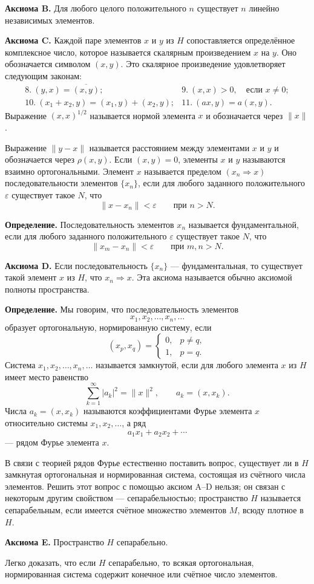 \begin{rusblock}
\textbf{Аксиома B.} Для любого целого положительного $n$ существует $n$ линейно независимых элементов.

\textbf{Аксиома C.} Каждой паре элементов $x$ и $y$ из $H$ сопоставляется определённое комплексное число, которое называется скалярным произведением $x$ на $y$. Оно обозначается символом $(x,y)$. Это скалярное произведение удовлетворяет следующим законам:
\[
\begin{array}{ll}
8.\ (y,x)=\overline{(x,y)}; & 9.\ (x,x)>0,\quad \text{если }x\ne0;\\
10.\ (x_1+x_2,y)=(x_1,y)+(x_2,y); & 11.\ (ax,y)=a(x,y).
\end{array}
\]
Выражение $(x,x)^{1/2}$ называется нормой элемента $x$ и обозначается через $\|x\|$.

Выражение $\|y-x\|$ называется расстоянием между элементами $x$ и $y$ и обозначается через $\rho(x,y)$. Если $(x,y)=0$, элементы $x$ и $y$ называются взаимно ортогональными. Элемент $x$ называется пределом $(x_n\Rightarrow x)$ последовательности элементов $\{x_n\}$, если для любого заданного положительного $\varepsilon$ существует такое $N$, что
\[
\|x-x_n\|<\varepsilon\qquad\text{при }n>N.
\]

\textbf{Определение.} Последовательность элементов $x_n$ называется фундаментальной, если для любого заданного положительного $\varepsilon$ существует такое $N$, что
\[
\|x_m-x_n\|<\varepsilon\qquad\text{при }m,n>N.
\]

\textbf{Аксиома D.} Если последовательность $\{x_n\}$ --- фундаментальная, то существует такой элемент $x$ из $H$, что $x_n\Rightarrow x$. Эта аксиома называется обычно аксиомой полноты пространства.

\textbf{Определение.} Мы говорим, что последовательность элементов
\[
x_1,x_2,\ldots,x_n,\ldots
\]
образует ортогональную, нормированную систему, если
\[
(x_p,x_q)=
\begin{cases}
0,&p\ne q,\\
1,&p=q.
\end{cases}
\]
Система $x_1,x_2,\ldots,x_n,\ldots$ называется замкнутой, если для любого элемента $x$ из $H$ имеет место равенство
\[
\sum_{k=1}^{\infty}|a_k|^2=\|x\|^2,\qquad a_k=(x,x_k).
\]
Числа $a_k=(x,x_k)$ называются коэффициентами Фурье элемента $x$ относительно системы $x_1,x_2,\ldots$, а ряд
\[
a_1x_1+a_2x_2+\cdots
\]
--- рядом Фурье элемента $x$.

В связи с теорией рядов Фурье естественно поставить вопрос, существует ли в $H$ замкнутая ортогональная и нормированная система, состоящая из счётного числа элементов. Решить этот вопрос с помощью аксиом A--D нельзя; он связан с некоторым другим свойством --- сепарабельностью; пространство $H$ называется сепарабельным, если имеется счётное множество элементов $M$, всюду плотное в $H$.

\textbf{Аксиома E.} Пространство $H$ сепарабельно.

Легко доказать, что если $H$ сепарабельно, то всякая ортогональная, нормированная система содержит конечное или счётное число элементов.
\end{rusblock}

